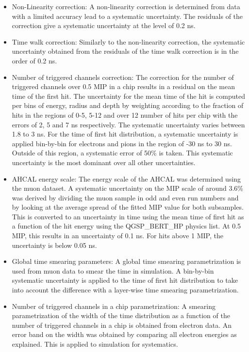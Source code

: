 \documentclass{JINST}
\begin{document}
\begin{itemize}
	\item Non-Linearity correction: A non-linearity correction is determined from data with a limited accuracy lead to a systematic uncertainty. The residuals of the correction give a systematic uncertainty at the level of 0.2 ns.
	\item Time walk correction: Similarly to the non-linearity correction, the systematic uncertainty obtained from the residuals of the time walk correction is in the order of 0.2 ns.
	\item Number of triggered channels correction: The correction for the number of triggered channels over 0.5 MIP in a chip results in a residual on the mean time of the first hit. The uncertainty for the mean time of the hit is computed per bins of energy, radius and depth by weighting according to the fraction of hits in the regions of 0-5, 5-12 and over 12 number of hits per chip with the errors of 2, 5 and 7 ns respectively. The systematic uncertainty varies between 1.8 to 3 ns. For the time of first hit distribution, a systematic uncertainty is applied bin-by-bin for electrons and pions in the region of -30 ns to 30 ns. Outside of this region, a systematic error of 50\% is taken. This systematic uncertainty is the most dominant over all other uncertainties.
	\item AHCAL energy scale: The energy scale of the AHCAL was determined using the muon dataset. A systematic uncertainty on the MIP scale of around 3.6\% was derived by dividing the muon sample in odd and even run numbers and by looking at the average spread of the fitted MIP value for both subsamples. This is converted to an uncertainty in time using the mean time of first hit as a function of the hit energy using the QGSP\_BERT\_HP physics list. At 0.5 MIP, this results in an uncertainty of 0.1 ns. For hits above 1 MIP, the uncertainty is below 0.05 ns.
	\item Global time smearing parameters: A global time smearing parametrization is used from muon data to smear the time in simulation. A bin-by-bin systematic uncertainty is applied to the time of first hit distribution to take into account the difference with a layer-wise time smearing parametrization.
	\item Number of triggered channels in a chip parametrization: A smearing parametrization of the width of the time distribution as a function of the number of triggered channels in a chip is obtained from electron data. An error band on the width was obtained by comparing all electron energies as explained. This is applied to simulation for systematics.

\end{itemize}
\end{document}
